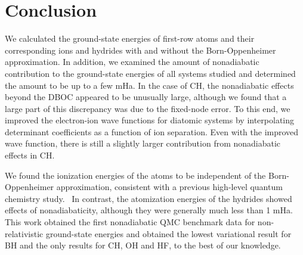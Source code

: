 \section{Conclusion}
We calculated the ground-state energies of first-row atoms and their corresponding ions and hydrides with and without the Born-Oppenheimer approximation. In addition, we examined the amount of nonadiabatic contribution to the ground-state energies of all systems studied and determined the amount to be up to a few mHa. In the case of CH, the nonadiabatic effects beyond the DBOC appeared to be unusually large, although we found that a large part of this discrepancy was due to the fixed-node error.
To this end, we improved the electron-ion wave functions for diatomic systems by interpolating determinant coefficients as a function of ion separation.
Even with the improved wave function, there is still a slightly larger contribution from nonadiabatic effects in CH.

We found the ionization energies of the atoms to be independent of the Born-Oppenheimer approximation, consistent with a previous high-level quantum chemistry study.~\cite{Klopper_IP} In contrast, the atomization energies of the hydrides showed effects of nonadiabaticity, although they were generally much less than 1 mHa. This work obtained the first nonadiabatic QMC benchmark data for non-relativistic ground-state energies and obtained the lowest variational result for BH and the only results for CH, OH and HF, to the best of our knowledge.


%